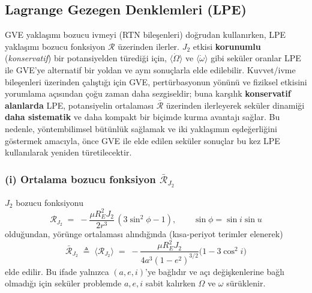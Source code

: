 \subsection{Lagrange Gezegen Denklemleri (LPE)}\label{subsec:J2_LPE}

GVE yaklaşımı bozucu ivmeyi (RTN bileşenleri) doğrudan kullanırken, LPE yaklaşımı bozucu fonksiyon $\mathcal{R}$ üzerinden ilerler. $J_2$ etkisi \textbf{korunumlu} (\emph{konservatif}) bir potansiyelden türediği için, $\langle\dot{\Omega}\rangle$ ve $\langle\dot{\omega}\rangle$ gibi seküler oranlar LPE ile GVE’ye alternatif bir yoldan ve aynı sonuçlarla elde edilebilir. Kuvvet/ivme bileşenleri üzerinden çalıştığı için GVE, pertürbasyonun yönünü ve fiziksel etkisini yorumlama açısından çoğu zaman daha sezgiseldir; buna karşılık \textbf{konservatif alanlarda} LPE, potansiyelin ortalaması $\bar{\mathcal{R}}$ üzerinden ilerleyerek seküler dinamiği \textbf{daha sistematik} ve daha kompakt bir biçimde kurma avantajı sağlar. Bu nedenle, yöntembilimsel bütünlük sağlamak ve iki yaklaşımın eşdeğerliğini göstermek amacıyla, önce GVE ile elde edilen seküler sonuçlar bu kez LPE kullanılarak yeniden türetilecektir.


\subsubsection*{(i) Ortalama bozucu fonksiyon $\bar{\mathcal R}_{J_2}$}
$J_2$ bozucu fonksiyonu
\[
\mathcal R_{J_2} \;=\; -\frac{\mu R_E^2 J_2}{2r^3}\,(3\sin^2\phi-1),
\qquad \sin\phi=\sin i\sin u
\]
olduğundan, yörünge ortalaması alındığında (kısa-periyot terimler elenerek)
\begin{equation}
\boxed{
\bar{\mathcal R}_{J_2}
\;\triangleq\; \big\langle \mathcal R_{J_2}\big\rangle
\;=\; -\frac{\mu R_E^2 J_2}{4a^3(1-e^2)^{3/2}}\big(1-3\cos^2 i\big)
}
\label{eq:Rbar_J2}
\end{equation}
elde edilir. Bu ifade yalnızca $(a,e,i)$’ye bağlıdır ve açı değişkenlerine bağlı olmadığı için
seküler problemde $a,e,i$ sabit kalırken $\Omega$ ve $\omega$ sürüklenir.


